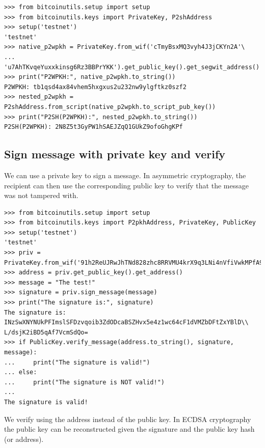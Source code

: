 \vspace{1em}
\begin{lstlisting}[style=Python]
>>> from bitcoinutils.setup import setup
>>> from bitcoinutils.keys import PrivateKey, P2shAddress 
>>> setup('testnet')
'testnet'
>>> native_p2wpkh = PrivateKey.from_wif('cTmyBsxMQ3vyh4J3jCKYn2A'\
...         'u7AhTKvqeYuxxkinsg6Rz3BBPrYKK').get_public_key().get_segwit_address()
>>> print("P2WPKH:", native_p2wpkh.to_string())
P2WPKH: tb1qsd4ax84vhem5hxgxus2u232nw9ylgftkz0szf2
>>> nested_p2wpkh = P2shAddress.from_script(native_p2wpkh.to_script_pub_key())
>>> print("P2SH(P2WPKH):", nested_p2wpkh.to_string())
P2SH(P2WPKH): 2N8Z5t3GyPW1hSAEJZqQ1GUkZ9ofoGhgKPf
\end{lstlisting}
\vspace{1em}


\subsection*{Sign message with private key and verify}
We can use a private key to sign a message. In asymmetric cryptography, the recipient can then use the corresponding public key to verify that the message was not tampered with.

\vspace{1em}
\begin{lstlisting}[style=Python,label={lst:sign-verify-message},caption={Use public key to sign a message and them verify},captionpos=b]
>>> from bitcoinutils.setup import setup
>>> from bitcoinutils.keys import P2pkhAddress, PrivateKey, PublicKey
>>> setup('testnet')
'testnet'
>>> priv = PrivateKey.from_wif('91h2ReUJRwJhTNd828zhc8RRVMU4krX9q3LNi4nVfiVwkMPfA9p')
>>> address = priv.get_public_key().get_address()
>>> message = "The test!"
>>> signature = priv.sign_message(message)
>>> print("The signature is:", signature)
The signature is: INzSwXNYNUkPFImslSFDzvqoib3ZdODcaBSZHvx5e4z1wc64cF1dVMZbDFtZxYBlD\\
L/dsjK2iBD5qAf7VcmSdQo=
>>> if PublicKey.verify_message(address.to_string(), signature, message):
...     print("The signature is valid!")
... else:
...     print("The signature is NOT valid!")
...
The signature is valid!
\end{lstlisting}
\vspace{1em}

\begin{note}
We verify using the address instead of the public key. In ECDSA cryptography the public key can be reconstructed given the signature and the public key hash (or address).
\end{note}


